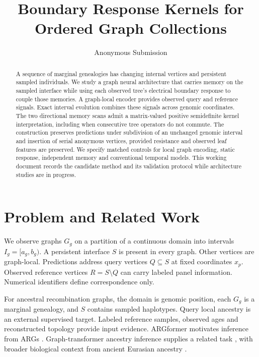 \documentclass[letterpaper]{article}
\title{Boundary Response Kernels for Ordered Graph Collections}
\author{Anonymous Submission}
\begin{document}
\maketitle
\begin{abstract}
A sequence of marginal genealogies has changing internal vertices and persistent sampled individuals. We study a graph neural architecture that carries memory on the sampled interface while using each observed tree's electrical boundary response to couple those memories. A graph-local encoder provides observed query and reference signals. Exact interval evolution combines these signals across genomic coordinates. The two directional memory scans admit a matrix-valued positive semidefinite kernel interpretation, including when consecutive tree operators do not commute. The construction preserves predictions under subdivision of an unchanged genomic interval and insertion of serial anonymous vertices, provided resistance and observed leaf features are preserved. We specify matched controls for local graph encoding, static response, independent memory and conventional temporal models. This working document records the candidate method and its validation protocol while architecture studies are in progress.
\end{abstract}

\section{Problem and Related Work}
We observe graphs $G_g$ on a partition of a continuous domain into intervals $I_g=[a_g,b_g)$. A persistent interface $S$ is present in every graph. Other vertices are graph-local. Predictions address query vertices $Q\subseteq S$ at fixed coordinates $x_p$. Observed reference vertices $R=S\setminus Q$ can carry labeled panel information. Numerical identifiers define correspondence only.

For ancestral recombination graphs, the domain is genomic position, each $G_g$ is a marginal genealogy, and $S$ contains sampled haplotypes. Query local ancestry is an external supervised target. Labeled reference samples, observed ages and reconstructed topology provide input evidence. ARGformer motivates inference from ARGs \citep{argformer2026}. Graph-transformer ancestry inference supplies a related task \citep{ancientancestry2026}, with broader biological context from ancient Eurasian ancestry \citep{eurasians2024}.
\end{document}
